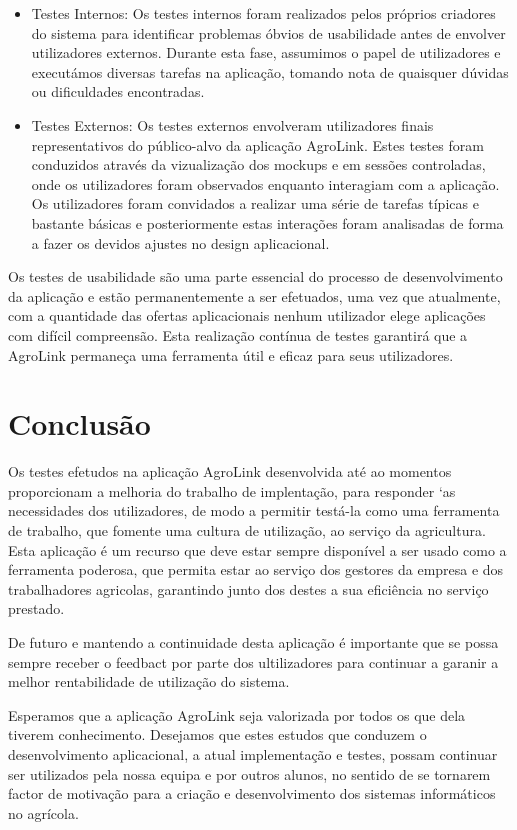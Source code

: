 \documentclass[a4paper,12pt]{report}
\begin{document}
	\begin{itemize}
	\item Testes Internos:	
	Os testes internos foram realizados pelos próprios criadores do sistema para identificar problemas óbvios de usabilidade antes de envolver utilizadores externos. Durante esta fase, assumimos o papel de utilizadores e executámos diversas tarefas na aplicação, tomando nota de quaisquer dúvidas ou dificuldades encontradas.
	
	\item Testes Externos:
		Os testes externos envolveram utilizadores finais representativos do público-alvo da aplicação AgroLink. Estes testes foram conduzidos através da vizualização dos mockups e em sessões controladas, onde os utilizadores foram observados enquanto interagiam com a aplicação. Os utilizadores foram convidados a realizar uma série de tarefas típicas e bastante básicas e posteriormente estas interações foram analisadas de forma a fazer os devidos ajustes no design aplicacional.
	
	\end{itemize}
	
	Os testes de usabilidade são uma parte essencial do processo de desenvolvimento da aplicação e estão permanentemente a ser efetuados, uma vez que atualmente, com a quantidade das ofertas aplicacionais nenhum utilizador elege aplicações com difícil compreensão. Esta realização contínua de testes garantirá que a AgroLink permaneça uma ferramenta útil e eficaz para seus utilizadores.
	
	
	\chapter{Conclusão}
	Os  testes efetudos na aplicação AgroLink desenvolvida até ao momentos proporcionam  a melhoria do trabalho de implentação, para responder `as necessidades dos utilizadores, de modo a permitir testá-la como uma ferramenta de trabalho, que fomente uma cultura de utilização, ao serviço da agricultura. Esta aplicação é um recurso que deve estar sempre disponível a ser usado como a ferramenta poderosa, que permita estar ao serviço dos gestores da empresa e dos trabalhadores agricolas, garantindo junto dos destes a sua eficiência no serviço prestado. 
	
	De futuro e  mantendo a continuidade desta aplicação é importante que se possa sempre receber o feedbact por parte dos ultilizadores para  continuar a garanir a melhor rentabilidade de utilização do sistema.
	
	Esperamos que a aplicação AgroLink seja valorizada por todos os que dela tiverem conhecimento. Desejamos que estes estudos que conduzem  o  desenvolvimento aplicacional, a atual implementação e testes, possam continuar ser utilizados pela nossa equipa e por outros alunos, no sentido de se tornarem factor de motivação para a criação e desenvolvimento dos sistemas informáticos no agrícola.
	
	
\end{document}
